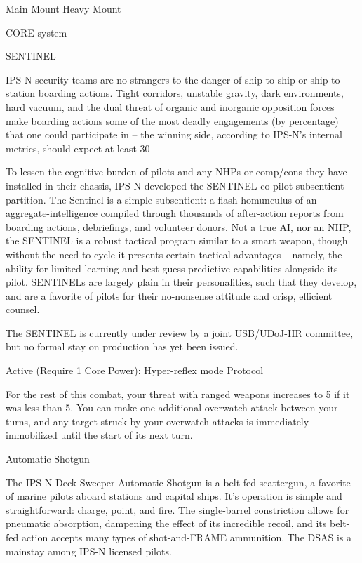  Main Mount                        Heavy Mount

                                                CORE system




                                                         SENTINEL


  IPS-N security teams are no strangers to the danger of ship-to-ship or ship-to-station boarding actions.
   Tight corridors, unstable gravity, dark environments, hard vacuum, and the dual threat of organic and
  inorganic opposition forces make boarding actions some of the most deadly engagements (by
  percentage) that one could participate in -- the winning side, according to IPS-N’s internal metrics,
  should expect at least 30%

   To lessen the cognitive burden of pilots and any NHPs or comp/cons they have installed in their chassis,
  IPS-N developed the SENTINEL co-pilot subsentient partition. The Sentinel is a simple subsentient: a
  flash-homunculus of an aggregate-intelligence compiled through thousands of after-action reports from
  boarding actions, debriefings, and volunteer donors. Not a true AI, nor an NHP, the SENTINEL is a
  robust tactical program similar to a smart weapon, though without the need to cycle it presents certain
  tactical advantages -- namely, the ability for limited learning and best-guess predictive capabilities
  alongside its pilot. SENTINELs are largely plain in their personalities, such that they develop, and are a
  favorite of pilots for their no-nonsense attitude and crisp, efficient counsel.

   The SENTINEL is currently under review by a joint USB/UDoJ-HR committee, but no formal stay on
  production has yet been issued.

  Active (Require 1 Core Power): Hyper-reflex mode
   Protocol

   For the rest of this combat, your threat with ranged weapons increases to 5 if it was less than 5. You
  can make one additional overwatch attack between your turns, and any target struck by your
  overwatch attacks is immediately immobilized until the start of its next turn.

Automatic Shotgun

The IPS-N Deck-Sweeper Automatic Shotgun is a belt-fed scattergun, a favorite of marine pilots aboard stations and
capital ships. It’s operation is simple and straightforward: charge, point, and fire. The single-barrel constriction allows
for pneumatic absorption, dampening the effect of its incredible recoil, and its belt-fed action accepts many types of
shot-and-FRAME ammunition.
The DSAS is a mainstay among IPS-N licensed pilots.

